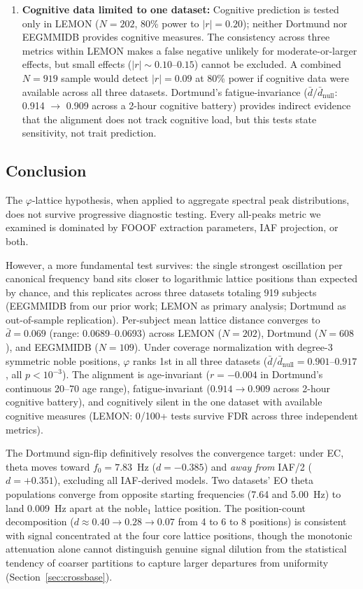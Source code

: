 \documentclass[11pt,a4paper]{article}
\newcommand{\phisym}{\varphi}
\newcommand{\fzero}{f_0}
\begin{document}
\begin{enumerate}
    \item \textbf{Cognitive data limited to one dataset:} Cognitive prediction is tested only in LEMON ($N = 202$, 80\% power to $|r| = 0.20$); neither Dortmund nor EEGMMIDB provides cognitive measures. The consistency across three metrics within LEMON makes a false negative unlikely for moderate-or-larger effects, but small effects ($|r| \sim 0.10$--$0.15$) cannot be excluded. A combined $N = 919$ sample would detect $|r| = 0.09$ at 80\% power if cognitive data were available across all three datasets. Dortmund's fatigue-invariance ($\bar{d}/\bar{d}_{\text{null}}$: 0.914 $\to$ 0.909 across a 2-hour cognitive battery) provides indirect evidence that the alignment does not track cognitive load, but this tests state sensitivity, not trait prediction.
\end{enumerate}

\subsection{Conclusion}

The $\phisym$-lattice hypothesis, when applied to aggregate spectral peak distributions, does not survive progressive diagnostic testing. Every all-peaks metric we examined is dominated by FOOOF extraction parameters, IAF projection, or both.

However, a more fundamental test survives: the single strongest oscillation per canonical frequency band sits closer to logarithmic lattice positions than expected by chance, and this replicates across three datasets totaling 919 subjects (EEGMMIDB from our prior work; LEMON as primary analysis; Dortmund as out-of-sample replication). Per-subject mean lattice distance converges to $\bar{d} = 0.069$ (range: 0.0689--0.0693) across LEMON ($N = 202$), Dortmund ($N = 608$), and EEGMMIDB ($N = 109$). Under coverage normalization with degree-3 symmetric noble positions, $\phisym$ ranks 1st in all three datasets ($\bar{d}/\bar{d}_{\text{null}} = 0.901$--$0.917$, all $p < 10^{-3}$). The alignment is age-invariant ($r = -0.004$ in Dortmund's continuous 20--70 age range), fatigue-invariant ($0.914 \to 0.909$ across 2-hour cognitive battery), and cognitively silent in the one dataset with available cognitive measures (LEMON: 0/100+ tests survive FDR across three independent metrics).

The Dortmund sign-flip definitively resolves the convergence target: under EC, theta moves toward $\fzero = 7.83$~Hz ($d = -0.385$) and \textit{away from} IAF/2 ($d = +0.351$), excluding all IAF-derived models. Two datasets' EO theta populations converge from opposite starting frequencies (7.64 and 5.00~Hz) to land 0.009~Hz apart at the noble$_1$ lattice position. The position-count decomposition ($d \approx 0.40 \to 0.28 \to 0.07$ from 4 to 6 to 8 positions) is consistent with signal concentrated at the four core lattice positions, though the monotonic attenuation alone cannot distinguish genuine signal dilution from the statistical tendency of coarser partitions to capture larger departures from uniformity (Section~\ref{sec:crossbase}).
\end{document}
